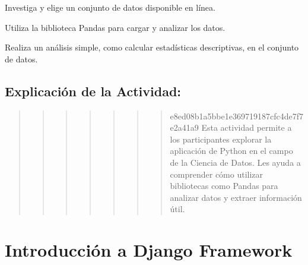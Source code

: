 \documentclass[
  a4paper,
  DIV=11,
  numbers=noendperiod,
  onepage,
  openany]{scrreprt}
\begin{document}
\begin{tcolorbox}[enhanced jigsaw, colbacktitle=quarto-callout-important-color!10!white, toprule=.15mm, leftrule=.75mm, titlerule=0mm, opacityback=0, rightrule=.15mm, opacitybacktitle=0.6, breakable, left=2mm, coltitle=black, title=\textcolor{quarto-callout-important-color}{\faExclamation}\hspace{0.5em}{Actividad Práctica:}, toptitle=1mm, bottomtitle=1mm, arc=.35mm, bottomrule=.15mm, colback=white, colframe=quarto-callout-important-color-frame]

Investiga y elige un conjunto de datos disponible en línea.

Utiliza la biblioteca Pandas para cargar y analizar los datos.

Realiza un análisis simple, como calcular estadísticas descriptivas, en
el conjunto de datos.

\end{tcolorbox}

\hypertarget{explicaciuxf3n-de-la-actividad-79}{%
\section{Explicación de la
Actividad:}\label{explicaciuxf3n-de-la-actividad-79}}

\begin{quote}
\begin{quote}
\begin{quote}
\begin{quote}
\begin{quote}
\begin{quote}
\begin{quote}
e8ed08b1a5bbe1e369719187cfc4de7f7e2a41a9 Esta actividad permite a los
participantes explorar la aplicación de Python en el campo de la Ciencia
de Datos. Les ayuda a comprender cómo utilizar bibliotecas como Pandas
para analizar datos y extraer información útil.
\end{quote}
\end{quote}
\end{quote}
\end{quote}
\end{quote}
\end{quote}
\end{quote}

\hypertarget{introducciuxf3n-a-django-framework}{%
\chapter{Introducción a Django
Framework}\label{introducciuxf3n-a-django-framework}}
\end{document}
